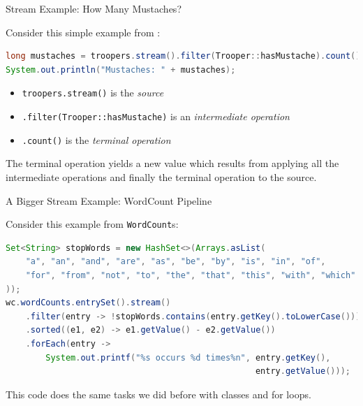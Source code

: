 \documentclass{beamer}
\begin{document}
\begin{frame}[fragile]{Stream Example: How Many Mustaches?}

Consider this simple example from :
\begin{lstlisting}[language=Java]
long mustaches = troopers.stream().filter(Trooper::hasMustache).count();
System.out.println("Mustaches: " + mustaches);
\end{lstlisting}

\begin{itemize}
\item {\tt troopers.stream()} is the {\it source}
\item {\tt .filter(Trooper::hasMustache)} is an {\it intermediate operation}
\item {\tt .count()} is the {\it terminal operation}
\end{itemize}
The terminal operation yields a new value which results from applying all the intermediate operations and finally the terminal operation to the source.

\end{frame}

\begin{frame}[fragile]{A Bigger Stream Example: WordCount Pipeline}

Consider this example from {\tt WordCount}s:
\begin{lstlisting}[language=Java]
Set<String> stopWords = new HashSet<>(Arrays.asList(
    "a", "an", "and", "are", "as", "be", "by", "is", "in", "of",
    "for", "from", "not", "to", "the", "that", "this", "with", "which"
));
wc.wordCounts.entrySet().stream()
    .filter(entry -> !stopWords.contains(entry.getKey().toLowerCase()))
    .sorted((e1, e2) -> e1.getValue() - e2.getValue())
    .forEach(entry ->
        System.out.printf("%s occurs %d times%n", entry.getKey(),
                                                  entry.getValue()));
\end{lstlisting}

This code does the same tasks we did before with classes and for loops.

\end{frame}
\end{document}
